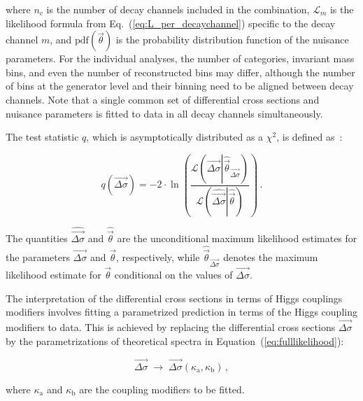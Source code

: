 % 
where $n_c$ is the number of decay channels included in the combination, $\mathcal{L}_m$ is the likelihood formula from Eq.~(\ref{eq:L_per_decaychannel}) specific to the decay channel $m$, and $\text{pdf}(\vec{\theta})$ is the probability distribution function of the nuisance parameters.
% 
For the individual analyses, the number of categories, invariant mass bins, and even the number of reconstructed bins may differ, although the number of bins at the generator level and their binning need to be aligned between decay channels.
% 
Note that a single common set of differential cross sections and nuisance parameters is fitted to data in all decay channels simultaneously.


The test statistic $q$, which is asymptotically distributed as a $\chi^2$, is defined as~\cite{Cowan:2010js}:
% 
\begin{linenomath*}
\begin{equation}
q(\vec{\Delta\sigma}) = -2 \cdot \ln \left(
    \frac{
        \mathcal{L}
            \left(
            \vec{\Delta\sigma} \left| \hat{\vec{\theta}}_{\vec{\Delta\sigma}}
            \right)\right.
        }{
        \mathcal{L}
            \left(
            \hat{\vec{\Delta\sigma}} \left| \hat{\vec{\theta}}
            \right)\right.
        }
\right)
\,.
\label{eq:TestStatisticQ}
\end{equation}
\end{linenomath*}
% 
The quantities $\hat{\vec{\Delta\sigma}}$ and $\hat{\vec{\theta}}$ are the unconditional maximum likelihood estimates for the parameters $\vec{\Delta\sigma}$ and $\vec{\theta}$, respectively, while $\hat{\vec{\theta}}_{\vec{\Delta\sigma}}$ denotes the maximum likelihood estimate for $\vec{\theta}$ conditional on the values of $\vec{\Delta\sigma}$.


The interpretation of the differential cross sections in terms of Higgs couplings modifiers involves fitting a parametrized prediction in terms of the Higgs coupling modifiers to data.
% 
This is achieved by replacing the differential cross sections $\vec{\Delta\sigma}$ by the parametrizations of theoretical spectra in Equation~(\ref{eq:fulllikelihood}):
% 
\begin{linenomath*}
\begin{equation}
\label{eq:likelihood-interpretation}
    \vec{\Delta\sigma} \; \to \; \vec{\Delta\sigma}( \kappa_\text{a}, \kappa_\text{b} )
    \,,
\end{equation}
\end{linenomath*}
% 
where $\kappa_\text{a}$ and $\kappa_\text{b}$ are the coupling modifiers to be fitted.


